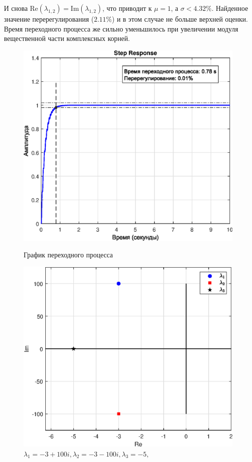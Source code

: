 \documentclass[a4paper]{article}
\begin{document}
И снова $\text{Re}(\lambda_{1,2})=\text{Im}(\lambda_{1, 2})$, что приводит к $\mu=1$, а $\sigma < 4.32\%$. Найденное значение перерегулирования ($2.11\%$) и в этом случае не больше верхней оценки. Время переходного процесса же сильно уменьшилось при увеличении модуля вещественной части комплексных корней.

\begin{figure}[H]
    \begin{minipage}{0.5\textwidth}
        \centering \includegraphics[width=\textwidth]{ex2/-3+100i_-3-100i_-5.eps}
        \caption{$\lambda_1=-3+100i, \lambda_2=-3-100i, \lambda_3=-5,$}
        \centerline{График переходного процесса}
    \end{minipage}\hfill
    \begin{minipage}{0.5\textwidth}
        \centering \includegraphics[width=\textwidth]{ex2/complex_plan_-3+100i_-3-100i_-5.eps}

\end{minipage}
\end{figure}
\end{document}
